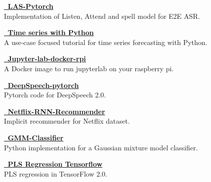 



\textcolor{SlateGrey}{\textbf{\href{https://github.com/jiwidi/las-pytorch}{ \faGithub \, LAS-Pytorch }}} \\ 
Implementation of Listen, Attend and spell model for E2E ASR.
\newline
\vspace{1pt}


\textcolor{SlateGrey}{\textbf{\href{https://github.com/jiwidi/time-series-forecasting-with-python}{\faGithub \,  Time series with Python  }}} \\ 
A use-case focused tutorial for time series forecasting with Python.
\newline
\vspace{1pt}


\textcolor{SlateGrey}{\textbf{\href{https://github.com/jiwidi/jupyter-lab-docker-rpi}{\faGithub \, Jupyter-lab-docker-rpi}}} \\ 
A Docker image to run jupyterlab on your raspberry pi. 
\newline
\vspace{1pt}


\textcolor{SlateGrey}{\textbf{\href{https://github.com/jiwidi/DeepSpeech-pytorch}{\faGithub \, DeepSpeech-pytorch}}} \\ 
Pytorch code for DeepSpeech 2.0.
\newline
\vspace{1pt}



\textcolor{SlateGrey}{\textbf{\href{https://github.com/jiwidi/Netflix-RNN-Recommender}{\faGithub \, Netflix-RNN-Recommender}}} \\ 
Implicit recommender for Netflix dataset.
\newline
\vspace{1pt}

\textcolor{SlateGrey}{\textbf{\href{https://github.com/jiwidi/gmm-classifier}{\faGithub \, GMM-Classifier}}} \\ 
Python implementation for a Gaussian mixture model classifier.
\newline
\vspace{1pt}

\textcolor{SlateGrey}{\textbf{\href{https://github.com/jiwidi/PLS-regression-tensorflow}{\faGithub \, PLS Regression Tensorflow}}} \\ 
PLS regression in TensorFlow 2.0.
\newline
\vspace{1pt}

